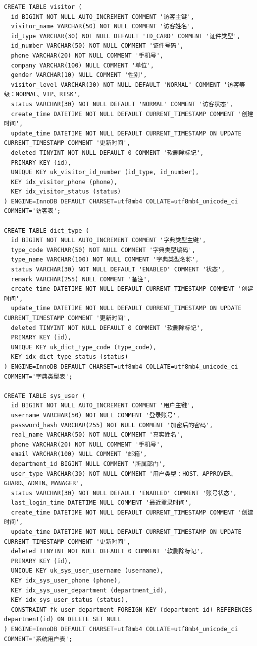\begin{lstlisting}[style=sqlstyle]
CREATE TABLE visitor (
  id BIGINT NOT NULL AUTO_INCREMENT COMMENT '访客主键',
  visitor_name VARCHAR(50) NOT NULL COMMENT '访客姓名',
  id_type VARCHAR(30) NOT NULL DEFAULT 'ID_CARD' COMMENT '证件类型',
  id_number VARCHAR(50) NOT NULL COMMENT '证件号码',
  phone VARCHAR(20) NOT NULL COMMENT '手机号',
  company VARCHAR(100) NULL COMMENT '单位',
  gender VARCHAR(10) NULL COMMENT '性别',
  visitor_level VARCHAR(30) NOT NULL DEFAULT 'NORMAL' COMMENT '访客等级：NORMAL、VIP、RISK',
  status VARCHAR(30) NOT NULL DEFAULT 'NORMAL' COMMENT '访客状态',
  create_time DATETIME NOT NULL DEFAULT CURRENT_TIMESTAMP COMMENT '创建时间',
  update_time DATETIME NOT NULL DEFAULT CURRENT_TIMESTAMP ON UPDATE CURRENT_TIMESTAMP COMMENT '更新时间',
  deleted TINYINT NOT NULL DEFAULT 0 COMMENT '软删除标记',
  PRIMARY KEY (id),
  UNIQUE KEY uk_visitor_id_number (id_type, id_number),
  KEY idx_visitor_phone (phone),
  KEY idx_visitor_status (status)
) ENGINE=InnoDB DEFAULT CHARSET=utf8mb4 COLLATE=utf8mb4_unicode_ci COMMENT='访客表';

CREATE TABLE dict_type (
  id BIGINT NOT NULL AUTO_INCREMENT COMMENT '字典类型主键',
  type_code VARCHAR(50) NOT NULL COMMENT '字典类型编码',
  type_name VARCHAR(100) NOT NULL COMMENT '字典类型名称',
  status VARCHAR(30) NOT NULL DEFAULT 'ENABLED' COMMENT '状态',
  remark VARCHAR(255) NULL COMMENT '备注',
  create_time DATETIME NOT NULL DEFAULT CURRENT_TIMESTAMP COMMENT '创建时间',
  update_time DATETIME NOT NULL DEFAULT CURRENT_TIMESTAMP ON UPDATE CURRENT_TIMESTAMP COMMENT '更新时间',
  deleted TINYINT NOT NULL DEFAULT 0 COMMENT '软删除标记',
  PRIMARY KEY (id),
  UNIQUE KEY uk_dict_type_code (type_code),
  KEY idx_dict_type_status (status)
) ENGINE=InnoDB DEFAULT CHARSET=utf8mb4 COLLATE=utf8mb4_unicode_ci COMMENT='字典类型表';

CREATE TABLE sys_user (
  id BIGINT NOT NULL AUTO_INCREMENT COMMENT '用户主键',
  username VARCHAR(50) NOT NULL COMMENT '登录账号',
  password_hash VARCHAR(255) NOT NULL COMMENT '加密后的密码',
  real_name VARCHAR(50) NOT NULL COMMENT '真实姓名',
  phone VARCHAR(20) NOT NULL COMMENT '手机号',
  email VARCHAR(100) NULL COMMENT '邮箱',
  department_id BIGINT NULL COMMENT '所属部门',
  user_type VARCHAR(30) NOT NULL COMMENT '用户类型：HOST、APPROVER、GUARD、ADMIN、MANAGER',
  status VARCHAR(30) NOT NULL DEFAULT 'ENABLED' COMMENT '账号状态',
  last_login_time DATETIME NULL COMMENT '最近登录时间',
  create_time DATETIME NOT NULL DEFAULT CURRENT_TIMESTAMP COMMENT '创建时间',
  update_time DATETIME NOT NULL DEFAULT CURRENT_TIMESTAMP ON UPDATE CURRENT_TIMESTAMP COMMENT '更新时间',
  deleted TINYINT NOT NULL DEFAULT 0 COMMENT '软删除标记',
  PRIMARY KEY (id),
  UNIQUE KEY uk_sys_user_username (username),
  KEY idx_sys_user_phone (phone),
  KEY idx_sys_user_department (department_id),
  KEY idx_sys_user_status (status),
  CONSTRAINT fk_user_department FOREIGN KEY (department_id) REFERENCES department(id) ON DELETE SET NULL
) ENGINE=InnoDB DEFAULT CHARSET=utf8mb4 COLLATE=utf8mb4_unicode_ci COMMENT='系统用户表';


\end{lstlisting}
